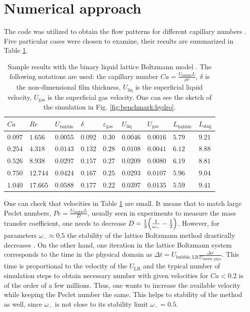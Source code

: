 \documentclass{article}
\newcommand{\lbubble}{L_{\mathrm{bubble}}}
\newcommand{\lslug}{L_{\mathrm{slug}}}
\newcommand{\ububble}{U_{\mathrm{bubble}}}
\newcommand{\uliq}{U_{\mathrm{liq}}}
\newcommand{\ugas}{U_{\mathrm{gas}}}
\newcommand{\omegaminus}{\omega_{-}}
\newcommand{\holdup}{\varepsilon_{\mathrm{gas}}}
\begin{document}
\section{Numerical approach}
\label{sec:numerics}
The code was utilized to obtain the flow patterns for different capillary numbers
\cite{kuzmin-binary2d}. Five particular cases were chosen to examine, their results are summarized
in Table \ref{table:capillary:cases}. 
\begin{table}[htb!]
\begin{tabularx}{\textwidth}{|X|X|X|X|X|X|X|X|X|}
\hline
$Ca$    &$Re$     &$\ububble$ &$\delta$&$\holdup$
&$\uliq$&$\ugas$&$\lbubble$&$\lslug$\\
\hline
$0.097$ &$1.656$  &$0.0055$ &$0.092$ &$0.30$ &$0.0046$&$0.0016$&$5.79$&$9.21$\\ 
$0.254$ &$4.318$  &$0.0143$ &$0.132$ &$0.28$ &$0.0108$&$0.0041$&$6.12$&$8.88$\\ 
$0.526$ &$8.938$  &$0.0297$ &$0.157$ &$0.27$ &$0.0209$&$0.0080$&$6.19$&$8.81$\\
$0.750$ &$12.744$ &$0.0424$ &$0.167$ &$0.25$ &$0.0293$&$0.0107$&$5.96$&$9.04$\\
$1.040$ &$17.665$ &$0.0588$ &$0.177$ &$0.22$ &$0.0397$&$0.0135$&$5.59$&$9.41$\\
\hline
\end{tabularx}
\caption{Sample results with the binary liquid lattice Boltzmann model \cite{kuzmin-binary2d}. The
following notations are used: the capillary number $Ca=\frac{\ububble L}{\rho \nu}$, $\delta$ is the
non-dimensional film thickness, $\uliq$ is the superficial liquid velocity, $\ugas$ is the
superficial gas velocity. One can see the sketch of the simulation in Fig.
\ref{fig:benchmark:hydro}. \label{table:capillary:cases}}
\end{table}
One can check that velocities in Table \ref{table:capillary:cases} are small. It means that to
match large Peclet numbers, $Pe=\frac{\ububble L}{D}$, usually seen in experiments to measure
the mass transfer coefficient, one needs to decrease
$D=\frac{1}{3}\Bigl(\frac{1}{\omegaminus}-\frac{1}{2}\Bigr)$. However, for parameters
$\omegaminus \approx 0.5$ the stability of the lattice Boltzmann method drastically decreases
\cite{kuzmin-d1q3}. On the other hand, one iteration in the lattice Boltzmann system corresponds
to the time in the physical domain as $\Delta t=U_{\mathrm{bubble,LB}} \frac{\Delta
x}{U_{\mathrm{bubble,phys}}}$. This time is proportional to the velocity of the $U_{\mathrm{LB}}$
and the typical number of simulation steps to obtain necessary number with given velocities for
$Ca<0.2$ is of the order of a few millions. Thus, one wants to increase the available velocity
while keeping the Peclet number the same. This helps to stability of the method as well, since
$\omegaminus$ is not close to its stability limit $\omegaminus=0.5$. 
\end{document}

